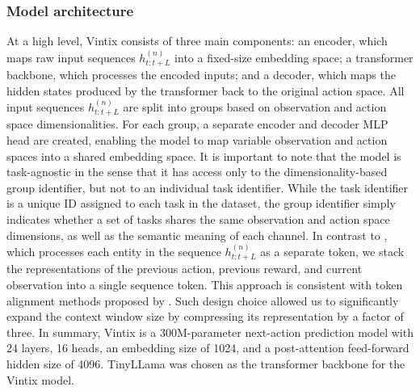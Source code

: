 \documentclass{article}
\theoremstyle{plain}
\theoremstyle{definition}
\theoremstyle{remark}
\begin{document}
\subsubsection{Model architecture}
At a high level, Vintix consists of three main components: an encoder, which maps raw input sequences $h_{t:t+L}^{(n)}$ into a fixed-size embedding space; a transformer backbone, which processes the encoded inputs; and a decoder, which maps the hidden states produced by the transformer back to the original action space.
All input sequences $h_{t:t+L}^{(n)}$ are split into groups based on observation and action space dimensionalities. For each group, a separate encoder and decoder MLP head are created, enabling the model to map variable observation and action spaces into a shared embedding space. It is important to note that the model is task-agnostic in the sense that it has access only to the dimensionality-based group identifier, but not to an individual task identifier. While the task identifier is a unique ID assigned to each task in the dataset, the group identifier simply indicates whether a set of tasks shares the same observation and action space dimensions, as well as the semantic meaning of each channel.
In contrast to \citet{laskin2022incontextreinforcementlearningalgorithm}, which processes each entity in the sequence $h_{t:t+L}^{(n)}$ as a separate token, we stack the representations of the previous action, previous reward, and current observation into a single sequence token. This approach is consistent with token alignment methods proposed by \citet{DBLP:journals/corr/DuanSCBSA16, grigsby2024amagoscalableincontextreinforcement, grigsby2024amago2breakingmultitaskbarrier}. Such design choice allowed us to significantly expand the context window size by compressing its representation by a factor of three.
In summary, Vintix is a 300M-parameter next-action prediction model with 24 layers, 16 heads, an embedding size of 1024, and a post-attention feed-forward hidden size of 4096. TinyLLama \cite{zhang2024tinyllama} was chosen as the transformer backbone for the Vintix model.
\end{document}
